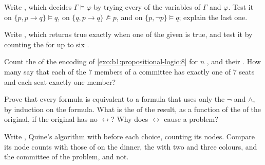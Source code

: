 \begin{exercise}[$\star\star$]\label{exo:b1:propositional-logic:7}
Write , which decides $\Gamma \models \varphi$ by trying every  of the
variables of $\Gamma$ and $\varphi$. Test it on $\{p, p \rightarrow q\} \models q$, on $\{q, p \rightarrow q\}
\not\models p$, and on $\{p, \neg p\} \models q$; explain the last one.
\end{exercise}

\begin{exercise}[$\star\star$]\label{exo:b1:propositional-logic:8}
Write , which returns  true exactly when one of the given  is true, and test it
by counting the  for up to six .
\end{exercise}

\begin{exercise}[$\star\star$]\label{exo:b1:propositional-logic:9}
Count the  of the encoding of \cref{exo:b1:propositional-logic:8} for $n$ , and their . How many
 say that each of the 7 members of a committee has exactly one of 7 seats and each seat exactly one member?
\end{exercise}

\begin{exercise}[$\star\star\star$]\label{exo:b1:propositional-logic:10}
Prove that every formula is equivalent to a formula that uses only the  $\neg$ and $\wedge$, by induction
on the formula. What is the  of the result, as a function of the  of the original, if the original has no
$\leftrightarrow$? Why does $\leftrightarrow$ cause a problem?
\end{exercise}

\begin{exercise}[$\star\star\star$]\label{exo:b1:propositional-logic:11}
Write , Quine's algorithm with  before each choice, counting its nodes. Compare its
node counts with those of  on the dinner, the  with two and three colours, and the committee
of the problem,  and not.
\end{exercise}

